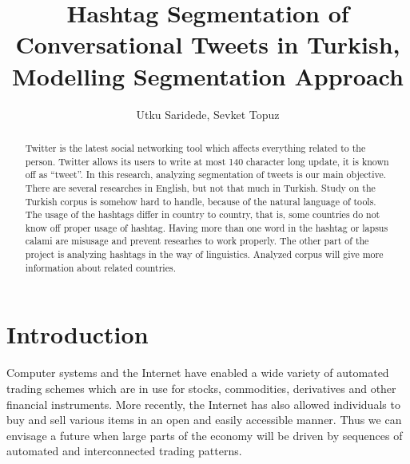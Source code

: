 \documentclass{comjnl}
\begin{document}
\title[Hashtag Segmentation of Conversational Tweets in Turkish]{Hashtag Segmentation of Conversational Tweets in Turkish, Modelling Segmentation Approach}
\author{Utku Saridede, Sevket Topuz}
 






\begin{abstract}
Twitter is the latest social networking tool which affects everything related to the person.
Twitter allows its users to write at most 140 character long update, it is known off as 
``tweet''. In this research, analyzing segmentation of tweets is our main objective. There are
several researches in English, but not that much in Turkish. Study on the Turkish corpus is
somehow hard to handle, because of the natural language of tools. The usage of the hashtags
differ in country to country, that is, some countries do not know off proper usage of hashtag.
Having more than one word in the hashtag or lapsus calami are misusage and prevent researhes 
to work properly. The other part of the project is analyzing hashtags in the way of linguistics.
Analyzed corpus will give more information about related countries.
\end{abstract}

\maketitle


\section{Introduction}

Computer systems and the Internet have enabled a wide variety of
automated trading schemes which are in use for stocks,
commodities, derivatives and other financial instruments. More
recently, the Internet has also allowed individuals to buy and
sell various items in an open and easily accessible manner. Thus
we can envisage a future when large parts of the economy will be
driven by sequences of automated and interconnected trading
patterns.
\end{document}
